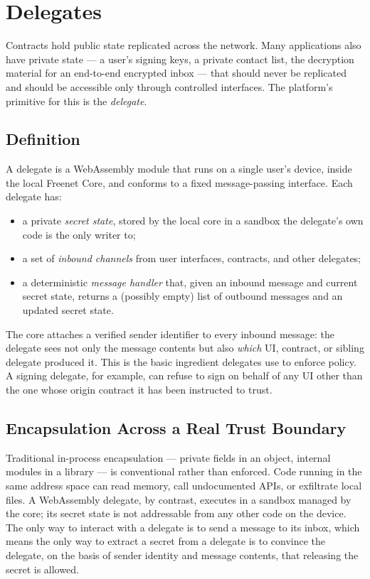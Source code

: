 \section{Delegates}
\label{sec:delegates}

Contracts hold public state replicated across the network. Many applications also have private state --- a user's signing keys, a private contact list, the decryption material for an end-to-end encrypted inbox --- that should never be replicated and should be accessible only through controlled interfaces. The platform's primitive for this is the \emph{delegate}.

\subsection{Definition}

A delegate is a WebAssembly module that runs on a single user's device, inside the local Freenet Core, and conforms to a fixed message-passing interface. Each delegate has:

\begin{itemize}[leftmargin=*, itemsep=2pt]
  \item a private \emph{secret state}, stored by the local core in a sandbox the delegate's own code is the only writer to;
  \item a set of \emph{inbound channels} from user interfaces, contracts, and other delegates;
  \item a deterministic \emph{message handler} that, given an inbound message and current secret state, returns a (possibly empty) list of outbound messages and an updated secret state.
\end{itemize}

The core attaches a verified sender identifier to every inbound message: the delegate sees not only the message contents but also \emph{which} UI, contract, or sibling delegate produced it. This is the basic ingredient delegates use to enforce policy. A signing delegate, for example, can refuse to sign on behalf of any UI other than the one whose origin contract it has been instructed to trust.

\subsection{Encapsulation Across a Real Trust Boundary}

Traditional in-process encapsulation --- private fields in an object, internal modules in a library --- is conventional rather than enforced. Code running in the same address space can read memory, call undocumented APIs, or exfiltrate local files. A WebAssembly delegate, by contrast, executes in a sandbox managed by the core; its secret state is not addressable from any other code on the device. The only way to interact with a delegate is to send a message to its inbox, which means the only way to extract a secret from a delegate is to convince the delegate, on the basis of sender identity and message contents, that releasing the secret is allowed.

